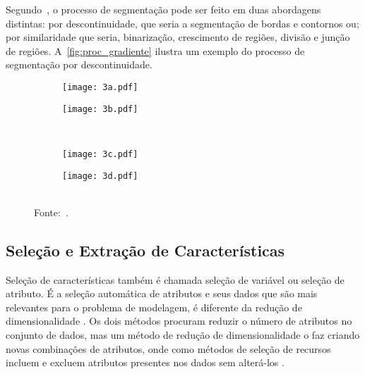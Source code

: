 Segundo~, o processo de segmentação pode ser feito em duas abordagens distintas: por descontinuidade, que seria a segmentação de bordas e contornos ou; por similaridade que seria, binarização, crescimento de regiões, divisão e junção de regiões. A~\autoref{fig:proc_gradiente} ilustra um exemplo do processo de segmentação por descontinuidade.

\begin{figure}[htb]
	\centering
	\caption[\footnotesize Processo de Segmentação por Descontinuidade.]{\footnotesize Processo de Segmentação por Descontinuidade. a) Imagem de entrada; b) $G_y$ Componente do gradiente vertical; c) $G_x$ Componente do Gradiente horizontal; d) Resultado dos contornos ligados entre si.}   %
	\label{fig:proc_gradiente}
	\begin{subfigure}{.4\textwidth}
		\centering
		\texttt{[image: 3a.pdf]}
		\caption{ }
	\end{subfigure}
	\begin{subfigure}{.4\textwidth}
		\centering
		\texttt{[image: 3b.pdf]}
		\caption{ }
	\end{subfigure}
	\\
	\begin{subfigure}{.4\textwidth}
		\centering
		\texttt{[image: 3c.pdf]}
		\caption{ }
	\end{subfigure}
	\begin{subfigure}{.4\textwidth}
		\centering
		\texttt{[image: 3d.pdf]}
		\caption{ }
	\end{subfigure}
	\\
	{\footnotesize Fonte:~.}
\end{figure}

\subsection{\textbf{Seleção e Extração de Características}}

Seleção de características também é chamada seleção de variável ou seleção de atributo. É a seleção automática de atributos e seus dados que são mais relevantes para o problema de modelagem, é diferente da redução de dimensionalidade \cite{brownlee2014}. Os dois métodos procuram reduzir o número de atributos no conjunto de dados, mas um método de redução de dimensionalidade o faz criando novas combinações de atributos, onde como métodos de seleção de recursos incluem e excluem atributos presentes nos dados sem alterá-los \cite{brownlee2014}.

